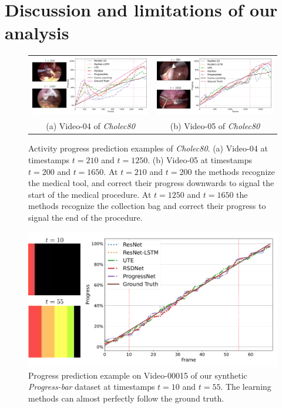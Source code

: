 \section{Discussion and limitations of our analysis}

\begin{figure}
\begin{center}
    \begin{tabular}{cc}
    \includegraphics[width=.45\linewidth]{media/examples/cholec_ex2.pdf}
    & \includegraphics[width=.45\linewidth]{media/examples/cholec_ex1.pdf} \\
    {\small (a) Video-04 of \textsl{Cholec80}} & 
    {\small (b) Video-05 of \textsl{Cholec80}} \\
    \end{tabular}
\end{center}
   \caption{Activity progress prediction examples of \textsl{Cholec80}.
   (a) Video-04 at timestamps $t{=}210$ and $t{=}1250$. 
   (b) Video-05 at timestamps $t{=}200$ and $t{=}1650$. 
    At $t{=}210$ and $t{=}200$ the methods recognize the medical tool, and correct their progress downwards to signal the start of the medical procedure.
    At $t{=}1250$ and $t{=}1650$ the methods recognize the collection bag and correct their progress to signal the end of the procedure.}
\label{fig:cholec_videos}
\end{figure}

\begin{figure}
\begin{center}
    \includegraphics[width=1.0\linewidth]{media/examples/bar_ex1.pdf} 
\end{center}
   \caption{Progress prediction example on Video-00015 of our synthetic \textsl{Progress-bar} dataset at timestamps $t{=}10$ and $t{=}55$. 
   The learning methods can almost perfectly follow the ground truth.}
\label{fig:bars_00015}
\end{figure}

